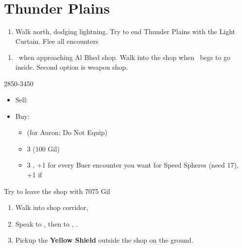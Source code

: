\chapter{Thunder Plains}

\begin{enumerate}
	\item Walk north, dodging lightning. Try to end Thunder Plains with the Light Curtain. Flee all encounters
\end{enumerate}
\begin{enumerate}[resume]
	\item \sd\ when approaching Al Bhed shop. Walk into the shop when \rikku\ begs to go inside. Second option is weapon shop.
\end{enumerate}
\begin{shop}{2850-3450}
	\begin{itemize}
		\item Sell: \katana{}
		\item Buy:
		      \begin{itemize}
			      \item \shimmeringblade{} (for Auron; Do Not Equip)
			      \item 3 \phoenixdown{} (100 Gil)
			      \item 3 \grenade{}, +1 for every Buer encounter you want for Speed Spheres (need 17), +1 if \blitzloss
		      \end{itemize}
	\end{itemize}
	Try to leave the shop with 7075 Gil
\end{shop}
\begin{enumerate}[resume]
	\item Walk into shop corridor, \cs[2:00]
	\item Speak to \auron, then to \rikku, \sd.
	\item Pickup the \textbf{Yellow Shield} outside the shop on the ground.
\end{enumerate}

